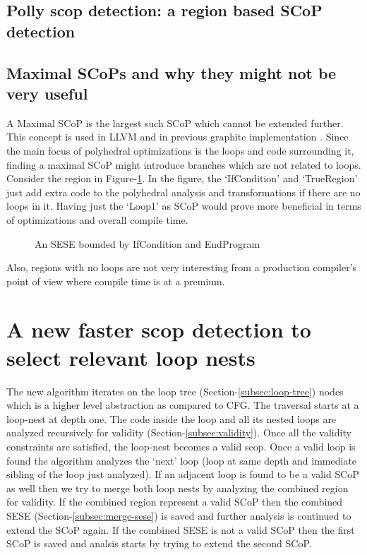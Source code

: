 \documentclass{sigplanconf}
\begin{document}
\subsection{Polly scop detection: a region based SCoP detection}

\subsection{Maximal SCoPs and why they might not be very useful}
\label{subsec:maximality}
A Maximal SCoP is the largest such SCoP which cannot be extended further. This
concept is used in LLVM \cite{polly} and in previous graphite implementation
\cite{graphite}.  Since the main focus of polyhedral optimizations is the loops
and code surrounding it, finding a maximal SCoP might introduce branches which
are not related to loops. Consider the region in Figure-\ref{fig:maximality}.
In the figure, the `IfCondition' and `TrueRegion' just add extra code to the
polyhedral analysis and transformations if there are no loops in it. Having just
the `Loop1' as SCoP would prove more beneficial in terms of optimizations and
overall compile time.

\begin{figure}
\centering
\caption{An SESE bounded by IfCondition and EndProgram}
\label{fig:maximality}
\end{figure}

Also, regions with no loops are not very interesting from a production
compiler's point of view where compile time is at a premium.

\section{A new faster scop detection to select relevant loop nests}
The new algorithm iterates on the loop tree (Section-\ref{subsec:loop-tree})
nodes which is a higher level abstraction as compared to CFG. The traversal
starts at a loop-nest at depth one.  The code inside the loop and all its nested
loops are analyzed recursively for validity
(Section-\ref{subsec:validity}). Once all the validity constraints are
satisfied, the loop-nest becomes a valid scop. Once a valid loop is found the
algorithm analyzes the `next' loop (loop at same depth and immediate sibling of
the loop just analyzed). If an adjacent loop is found to be a valid SCoP as well
then we try to merge both loop nests by analyzing the combined region for
validity. If the combined region represent a valid SCoP then the combined SESE
(Section-\ref{subsec:merge-sese}) is saved and further analysis is continued to
extend the SCoP again. If the combined SESE is not a valid SCoP then the first
SCoP is saved and analsis starts by trying to extend the second SCoP.
\end{document}
